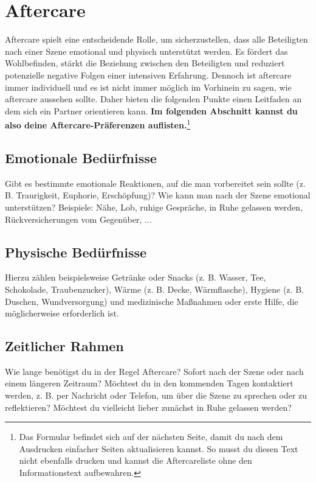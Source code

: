 \documentclass[a4paper,12pt]{article}
\begin{document}
\section{Aftercare}
Aftercare spielt eine entscheidende Rolle, um sicherzustellen, dass alle Beteiligten nach einer Szene emotional und physisch unterstützt werden. Es fördert das Wohlbefinden, stärkt die Beziehung zwischen den Beteiligten und reduziert potenzielle negative Folgen einer intensiven Erfahrung. Dennoch ist aftercare immer individuell und es ist nicht immer möglich im Vorhinein zu sagen, wie aftercare aussehen sollte. Daher bieten die folgenden Punkte einen Leitfaden an dem sich ein Partner orientieren kann.
\textbf{Im folgenden Abschnitt kannst du also deine Aftercare-Präferenzen auflisten.}\footnote{Das Formular befindet sich auf der nächsten Seite, damit du nach dem Ausdrucken einfacher Seiten aktualisieren kannst. So musst du diesen Text nicht ebenfalls drucken und kannst die Aftercareliste ohne den Informationstext aufbewahren.}
\newpage

\subsection{Emotionale Bedürfnisse}
\noindent Gibt es bestimmte emotionale Reaktionen, auf die man vorbereitet sein sollte (z. B. Traurigkeit, Euphorie, Erschöpfung)? Wie kann man nach der Szene emotional unterstützen? Beispiele: Nähe, Lob, ruhige Gespräche, in Ruhe gelassen werden, Rückversicherungen vom Gegenüber, ... \newline
\noindent \TextField[name=AftercareEmotional,multiline=true,height=7em, width=37em]{}

\subsection{Physische Bedürfnisse}
\noindent Hierzu zählen beispielsweise Getränke oder Snacks (z. B. Wasser, Tee, Schokolade, Traubenzucker), Wärme (z. B. Decke, Wärmflasche), Hygiene (z. B. Duschen, Wundversorgung) und medizinische Maßnahmen oder erste Hilfe, die möglicherweise erforderlich ist. \newline
\noindent \TextField[name=AftercarePhysisch,multiline=true,height=7em, width=37em]{}

\subsection{Zeitlicher Rahmen}
\noindent Wie lange benötigst du in der Regel Aftercare? Sofort nach der Szene oder nach einem längeren Zeitraum? Möchtest du in den kommenden Tagen kontaktiert werden, z. B. per Nachricht oder Telefon, um über die Szene zu sprechen oder zu reflektieren? Möchtest du vielleicht lieber zunächst in Ruhe gelassen werden? \newline
\noindent \TextField[name=AftercareZeitlich,multiline=true,height=7em, width=37em]{}
\end{document}
